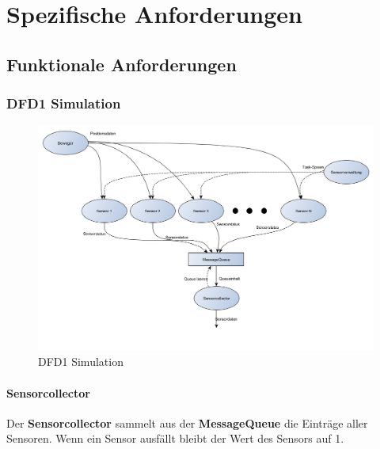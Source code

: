 \section{Spezifische Anforderungen}
\subsection{Funktionale Anforderungen}
\subsubsection{DFD1 Simulation}
\begin{figure}[H]
	\centering
  \includegraphics[width=\textwidth]{DFD/dfd1_simulation1_1.png}
	\caption{DFD1 Simulation}
	\label{fig1}
\end{figure}
\paragraph{Sensorcollector}
Der \textbf{Sensorcollector} sammelt aus der \textbf{MessageQueue} die Einträge aller Sensoren. Wenn ein Sensor ausfällt bleibt der Wert des Sensors auf 1.